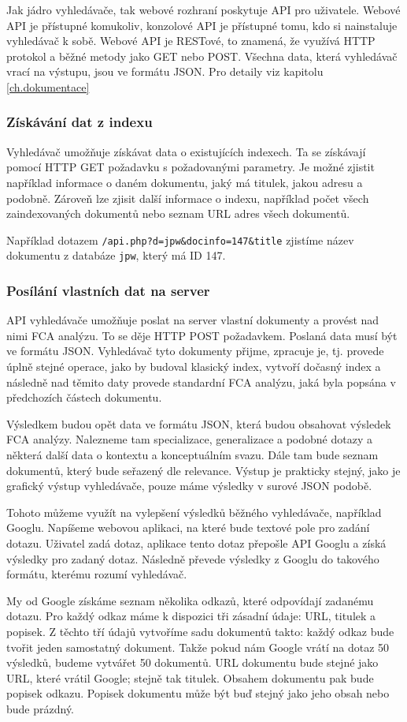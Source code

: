\documentclass[12pt]{article}
\newcommand{\code}[1]{\texttt{#1}}
\newcommand{\sssection}[1]{\subsubsection{#1}}
\begin{document}
Jak jádro vyhledávače, tak webové rozhraní poskytuje API pro uživatele. Webové API je přístupné komukoliv, konzolové API je přístupné tomu, kdo si nainstaluje vyhledávač k sobě. Webové API je RESTové, to znamená, že využívá HTTP protokol a běžné metody jako GET nebo POST. Všechna data, která vyhledávač vrací na výstupu, jsou ve formátu JSON. Pro detaily viz kapitolu \ref{ch.dokumentace}

\sssection{Získávání dat z indexu}

Vyhledávač umožňuje získávat data o existujících indexech. Ta se získávají pomocí HTTP GET požadavku s požadovanými parametry. Je možné zjistit například informace o daném dokumentu, jaký má titulek, jakou adresu a podobně. Zároveň lze zjisit další informace o indexu, například počet všech zaindexovaných dokumentů nebo seznam URL adres všech dokumentů.

Například dotazem \code{/api.php?d=jpw\&docinfo=147\&title} zjistíme název dokumentu z databáze \code{jpw}, který má ID 147.

\sssection{Posílání vlastních dat na server}
API vyhledávače umožňuje poslat na server vlastní dokumenty a provést nad nimi FCA analýzu. To se děje HTTP POST požadavkem. Poslaná data musí být ve formátu JSON. Vyhledávač tyto dokumenty přijme, zpracuje je, tj. provede úplně stejné operace, jako by budoval klasický index, vytvoří dočasný index a následně nad těmito daty provede standardní FCA analýzu, jaká byla popsána v předchozích částech dokumentu. 

Výsledkem budou opět data ve formátu JSON, která budou obsahovat výsledek FCA analýzy. Nalezneme tam specializace, generalizace a podobné dotazy a některá další data o kontextu a konceptuálním svazu. Dále tam bude seznam dokumentů, který bude seřazený dle relevance. Výstup je prakticky stejný, jako je grafický výstup vyhledávače, pouze máme výsledky v surové JSON podobě. 

Tohoto můžeme využít na vylepšení výsledků běžného vyhledávače, například Googlu. Napíšeme webovou aplikaci, na které bude textové pole pro zadání dotazu. Uživatel zadá dotaz, aplikace tento dotaz přepošle API Googlu a získá výsledky pro zadaný dotaz. Následně převede výsledky z Googlu do takového formátu, kterému rozumí vyhledávač.

My od Google získáme seznam několika odkazů, které odpovídají zadanému dotazu. Pro každý odkaz máme k dispozici tři zásadní údaje: URL, titulek a popisek. Z těchto tří údajů vytvoříme sadu dokumentů takto: každý odkaz bude tvořit jeden samostatný dokument. Takže pokud nám Google vrátí na dotaz 50 výsledků, budeme vytvářet 50 dokumentů. URL dokumentu bude stejné jako URL, které vrátil Google; stejně tak titulek. Obsahem dokumentu pak bude popisek odkazu. Popisek dokumentu může být buď stejný jako jeho obsah nebo bude prázdný.
\end{document}
